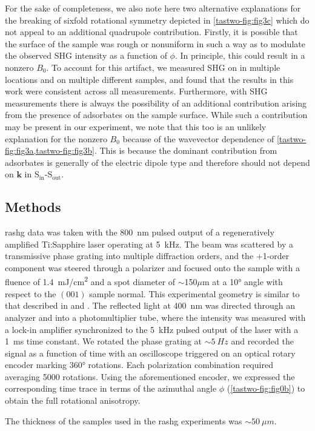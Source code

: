 For the sake of completeness, we also note here two alternative explanations for the breaking of sixfold rotational symmetry depicted in \cref{tastwo-fig:fig3c} which do not appeal to an additional quadrupole contribution.
Firstly, it is possible that the surface of the sample was rough or nonuniform in such a way as to modulate the observed SHG intensity as a function of $\phi$.
In principle, this could result in a nonzero $B_0$.
To account for this artifact, we measured SHG on \tastwo in multiple locations and on multiple different samples, and found that the results in this work were consistent across all measurements.
Furthermore, with SHG measurements there is always the possibility of an additional contribution arising from the presence of adsorbates on the sample surface\citep{berkovic_interference_1988}.
While such a contribution may be present in our experiment, we note that this too is an unlikely explanation for the nonzero $B_0$ because of the wavevector dependence of \cref{tastwo-fig:fig3a,tastwo-fig:fig3b}.
This is because the dominant contribution from adsorbates is generally of the electric dipole type and therefore should not depend on $\bm{k}$ in S$_\mathrm{in}$-S$_\mathrm{out}$.

\subsection{Methods}

\gls{rashg} data was taken with the \qty{800}{nm} pulsed output of a regeneratively amplified Ti:Sapphire laser operating at \qty{5}{kHz}.
The beam was scattered by a transmissive phase grating into multiple diffraction orders, and the +1-order component was steered through a polarizer and focused onto the sample with a fluence of \qty{1.4}{mJ/cm^2} and a spot diameter of $\sim$150$\mu$m at a \ang{10} angle with respect to the $(001)$ sample normal.
This experimental geometry is similar to that described in \citet{harter_high-speed_2015} and \citet{torchinsky_low_2014}.
The reflected light at \qty{400}{nm} was directed through an analyzer and into a photomultiplier tube, where the intensity was measured with a lock-in amplifier synchronized to the \qty{5}{kHz} pulsed output of the laser with a \qty{1}{ms} time constant.
We rotated the phase grating at $\sim\qty{5}{Hz}$ and recorded the signal as a function of time with an oscilloscope triggered on an optical rotary encoder marking \ang{360} rotations.
Each polarization combination required averaging 5000 rotations.
Using the aforementioned encoder, we expressed the corresponding time trace in terms of the azimuthal angle $\phi$ (\cref{tastwo-fig:fig0b}) to obtain the full rotational anisotropy.

The thickness of the samples used in the \gls{rashg} experiments was $\sim\qty{50}{\mu m}$.
